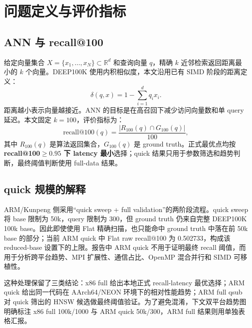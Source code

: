 \documentclass[11pt,a4paper]{article}
\begin{document}
\tableofcontents
\newpage

\section{问题定义与评价指标}

\subsection{ANN 与 recall@100}

给定向量集合 $X=\{x_1,\ldots,x_N\}\subset\mathbb{R}^{d}$ 和查询向量 $q$，精确 $k$ 近邻检索返回距离最小的 $k$ 个向量。DEEP100K 使用内积相似度，本文沿用已有 SIMD 阶段的距离定义：
\begin{equation}
\delta(q,x)=1-\sum_{i=1}^{d} q_i x_i .
\end{equation}
距离越小表示向量越接近。ANN 的目标是在高召回下减少访问向量数和单 query 延迟。本文固定 $k=100$，评价指标为：
\begin{equation}
\mathrm{recall@100}(q)=\frac{|R_{100}(q)\cap G_{100}(q)|}{100},
\end{equation}
其中 $R_{100}(q)$ 是算法返回集合，$G_{100}(q)$ 是 ground truth。正式最优点均按 \textbf{recall@100$\ge0.95$ 下 latency 最小}选择；quick 结果只用于参数筛选和趋势判断，最终阈值判断使用 full-data 结果。

\subsection{quick 规模的解释}

ARM/Kunpeng 侧采用“quick sweep + full validation”的两阶段流程。quick sweep 将 base 限制为 50k，query 限制为 300，但 ground truth 仍来自完整 DEEP100K 100k base。因此即使使用 Flat 精确扫描，也只能命中 ground truth 中落在前 50k base 的部分；当前 ARM quick 中 Flat raw recall@100 为 0.502733，构成该 reduced-base 设置下的上限。报告中 ARM quick 不用于证明最终 recall 阈值，而用于分析跨平台趋势、MPI 扩展性、通信占比、OpenMP 混合并行和 SIMD 可移植性。

这种处理保留了三类结论：x86 full 给出本地正式 recall-latency 最优选择；ARM quick 给出同一代码在 AArch64/NEON 环境下的相对性能趋势；ARM full qsub 对 quick 筛出的 HNSW 候选做最终阈值验证。为了避免混淆，下文双平台趋势图明确标注 x86 full 100k/1000 与 ARM quick 50k/300，ARM full 结果则用单独表格汇报。

\end{document}

